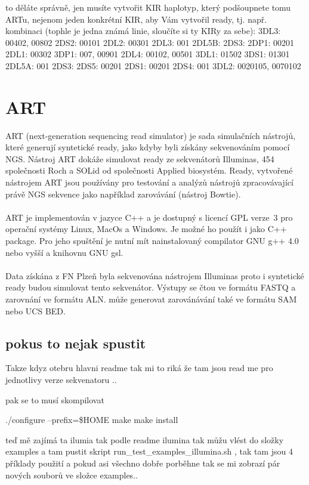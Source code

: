 \documentclass[czech,DP]{thesiskiv}
\begin{document}
to děláte správně, jen musíte vytvořit KIR haplotyp, který podšoupnete tomu ARTu, nejenom jeden konkrétní KIR, aby Vám vytvořil ready, tj. např. kombinaci (tophle je jedna známá linie, sloučíte si ty KIRy za sebe):
3DL3: 00402, 00802
2DS2: 00101
2DL2: 00301
2DL3: 001
2DL5B:
2DS3:
2DP1: 00201
2DL1: 00302
3DP1: 007, 00901
2DL4: 00102, 00501
3DL1: 01502
3DS1: 01301
2DL5A: 001
2DS3:
2DS5: 00201
2DS1: 00201
2DS4: 001
3DL2: 0020105, 0070102


\section{ART}
ART (next-generation sequencing read simulator) je sada simulačních nástrojů, které generují syntetické ready, jako kdyby byli získány sekvenováním pomocí NGS. Nástroj ART dokáže simulovat ready ze sekvenátorů Illuminas, 454 společnosti Roch a SOLid od společnosti Applied biosystém. Ready, vytvořené nástrojem ART jsou používány pro testování a analýzů nástrojů zpracovávající právě NGS sekvence jako například zarovávání (nástroj Bowtie). 
\\
\\
ART je implementován v jazyce C++ a je dostupný s licencí GPL verze~3 pro operační systémy Linux, MacOs a Windows. Je možné ho použít i jako C++ package. Pro jeho spuštění je nutní mít nainstalovaný compilator GNU g++ 4.0 nebo vyšší a knihovnu GNU gsl. 
\\
\\
Data získána z FN Plzeň byla sekvenována nástrojem Illuminas proto i syntetické ready budou simulovat tento sekvenátor.    
 Výstupy se čtou ve formátu FASTQ a zarovnání ve formátu ALN. může generovat zarovánávání také ve formátu SAM nebo UCS BED. \cite{art}




\subsection{pokus to nejak spustit}
Takze kdyz otebru hlavni readme tak mi to riká že tam jsou read me pro jednotlivy verze sekvenatoru ..

pak se to musí skompilovat 

./configure --prefix=\$HOME
	       	make
	       	make install	 
	 
teď mě zajímá ta ilumia tak podle readme ilumina tak můžu vlést do složky examples a tam pustit skript run\_test\_examples\_illumina.sh , tak tam jsou 4 příklady použití 
a pokud asi všechno dobře porběhne tak se mi zobrazí pár nových souborů ve složce examples.. 
\end{document}
